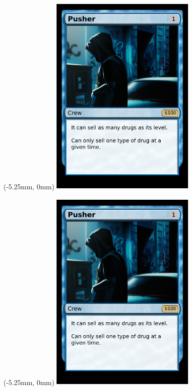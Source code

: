 \documentclass{article}
\begin{document}
    \begin{textblock*}{0mm}(-5.25mm, 0mm)
        \includegraphics[width=70mm, height=99mm]{../png/crew/pusher/pusher1.png}
    \end{textblock*}

	\begin{textblock*}{0mm}(-5.25mm, 0mm)
        \includegraphics[width=70mm, height=99mm]{../png/crew/pusher/pusher1.png}
    \end{textblock*}
\end{document}
